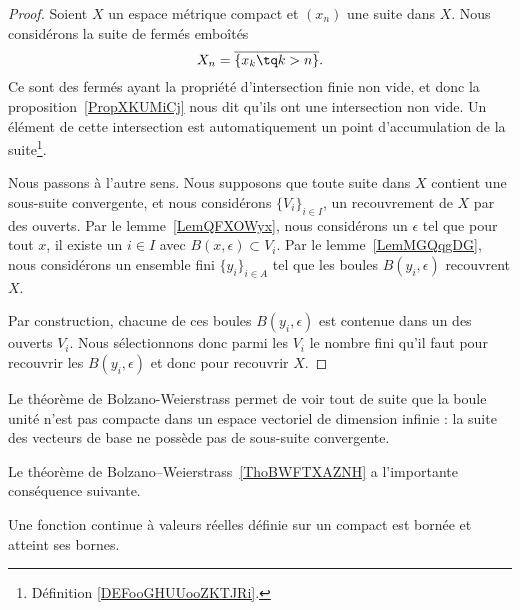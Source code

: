 \begin{proof}
	Soient \( X\) un espace métrique compact et \( (x_n)\) une suite dans \( X\). Nous considérons la suite de fermés emboîtés
	\begin{equation}
		X_n=\overline{ \{ x_k\tq k>n \} }.
	\end{equation}
	Ce sont des fermés ayant la propriété d'intersection finie non vide, et donc la proposition~\ref{PropXKUMiCj} nous dit qu'ils ont une intersection non vide. Un élément de cette intersection est automatiquement un point d'accumulation de la suite\footnote{Définition \ref{DEFooGHUUooZKTJRi}.}.

	Nous passons à l'autre sens. Nous supposons que toute suite dans \( X\) contient une sous-suite convergente, et nous considérons \( \{ V_i \}_{i\in I}\), un recouvrement de \( X\) par des ouverts. Par le lemme~\ref{LemQFXOWyx}, nous considérons un \( \epsilon\) tel que pour tout \( x\), il existe un \( i\in I\) avec \( B(x,\epsilon)\subset V_i\). Par le lemme~\ref{LemMGQqgDG}, nous considérons un ensemble fini \( \{ y_i \}_{i\in A}\) tel que les boules \( B(y_i,\epsilon)\) recouvrent \( X\).

	Par construction, chacune de ces boules \( B(y_i,\epsilon)\) est contenue dans un des ouverts \( V_i\). Nous sélectionnons donc parmi les \( V_i\) le nombre fini qu'il faut pour recouvrir les \( B(y_i,\epsilon)\) et donc pour recouvrir \( X\).
\end{proof}

\begin{example}\label{ExEFYooTILPDk}
	Le théorème de Bolzano-Weierstrass permet de voir tout de suite que la boule unité n'est pas compacte dans un espace vectoriel de dimension infinie : la suite des vecteurs de base ne possède pas de sous-suite convergente.
\end{example}


Le théorème de Bolzano–Weierstrass~\ref{ThoBWFTXAZNH} a l'importante conséquence suivante.
\begin{theorem}[Weierstrass]		\label{ThoWeirstrassRn}
	Une fonction continue à valeurs réelles définie sur un compact est bornée et atteint ses bornes.
\end{theorem}

